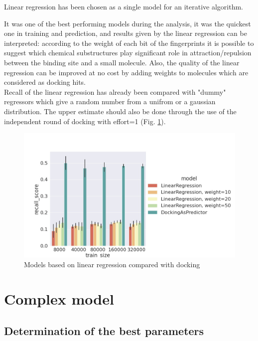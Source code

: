 Linear regression has been chosen as a single model for an iterative algorithm. 

It was one of the best performing models during the analysis, it was the quickest 
one in training and prediction, and results given by the linear regression can be 
interpreted: according to the weight of each bit of the fingerprints it is possible 
to suggest which chemical substructures play significant role in attraction/repulsion 
between the binding site and a small molecule. 
Also, the quality of the linear regression can be improved at no cost by adding 
weights to molecules which are considered as docking hits.\\

Recall of the linear regression has already been compared with "dummy" regressors 
which give a random number from a unifrom or a gaussian distribution.
The upper estimate should also be done through the use of the independent round 
of docking with effort=1 (Fig. \ref{linregVSdocking}).

\begin{figure}[H]
\includegraphics[scale = 0.45]{Images/LRvsD.jpg}
\caption{Models based on linear regression compared with docking}
\label{linregVSdocking}
\end{figure}

\hfill\break
\section{Complex model}

\subsection{Determination of the best parameters}

